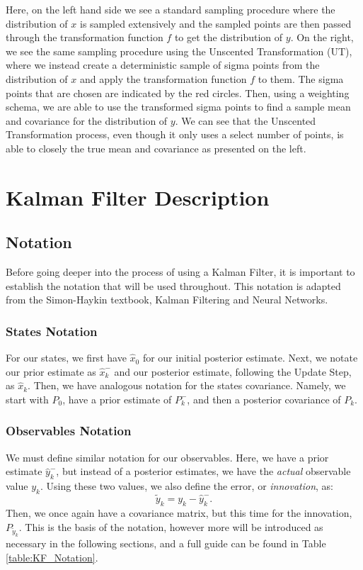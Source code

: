 \documentclass{article}
\begin{document}
    Here, on the left hand side we see a standard sampling procedure where the distribution of $x$ is sampled extensively and the sampled points are then passed through the transformation function $f$ to get the distribution of $y$. On the right, we see the same sampling procedure using the Unscented Transformation (UT), where we instead create a deterministic sample of sigma points from the distribution of $x$ and apply the transformation function $f$ to them. The sigma points that are chosen are indicated by the red circles. Then, using a weighting schema, we are able to use the transformed sigma points to find a sample mean and covariance for the distribution of $y$. We can see that the Unscented Transformation process, even though it only uses a select number of points, is able to closely the true mean and covariance as presented on the left. 
    
    \section{Kalman Filter Description}
    
    \subsection{Notation}
    Before going deeper into the process of using a Kalman Filter, it is important to establish the notation that will be used throughout. This notation is adapted from the Simon-Haykin textbook, Kalman Filtering and Neural Networks. \cite{SimonHaykinText}
    \subsubsection{States Notation}
    For our states, we first have $\hat{x}_0$ for our initial posterior estimate. Next, we notate our prior estimate as $\hat{x}_k^-$ and our posterior estimate, following the Update Step, as $\hat{x}_k$. Then, we have analogous notation for the states covariance. Namely, we start with $P_0$, have a prior estimate of $P_k^-$, and then a posterior covariance of $P_k$.
    \subsubsection{Observables Notation}
    We must define similar notation for our observables. Here, we have a prior estimate $\hat{y}_k^-$, but instead of a posterior estimates, we have the \emph{actual} observable value $y_k$. Using these two values, we also define the error, or \emph{innovation}, as:
    \begin{equation}
    \tilde{y}_k = y_k - \hat{y}_k^-.    
    \end{equation}
    Then, we once again have a covariance matrix, but this time for the innovation, $P_{\tilde{y}_k}$. This is the basis of the notation, however more will be introduced as necessary in the following sections, and a full guide can be found in Table \ref{table:KF_Notation}.
    
\end{document}
